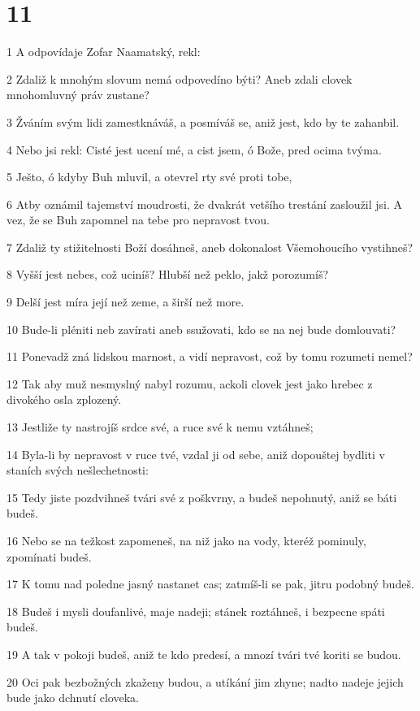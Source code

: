 \chapter{11}

\par 1 A odpovídaje Zofar Naamatský, rekl:
\par 2 Zdaliž k mnohým slovum nemá odpovedíno býti? Aneb zdali clovek mnohomluvný práv zustane?
\par 3 Žváním svým lidi zamestknáváš, a posmíváš se, aniž jest, kdo by te zahanbil.
\par 4 Nebo jsi rekl: Cisté jest ucení mé, a cist jsem, ó Bože, pred ocima tvýma.
\par 5 Ješto, ó kdyby Buh mluvil, a otevrel rty své proti tobe,
\par 6 Atby oznámil tajemství moudrosti, že dvakrát vetšího trestání zasloužil jsi. A vez, že se Buh zapomnel na tebe pro nepravost tvou.
\par 7 Zdaliž ty stižitelnosti Boží dosáhneš, aneb dokonalost Všemohoucího vystihneš?
\par 8 Vyšší jest nebes, což uciníš? Hlubší než peklo, jakž porozumíš?
\par 9 Delší jest míra její než zeme, a širší než more.
\par 10 Bude-li pléniti neb zavírati aneb ssužovati, kdo se na nej bude domlouvati?
\par 11 Ponevadž zná lidskou marnost, a vidí nepravost, což by tomu rozumeti nemel?
\par 12 Tak aby muž nesmyslný nabyl rozumu, ackoli clovek jest jako hrebec z divokého osla zplozený.
\par 13 Jestliže ty nastrojíš srdce své, a ruce své k nemu vztáhneš;
\par 14 Byla-li by nepravost v ruce tvé, vzdal ji od sebe, aniž dopouštej bydliti v staních svých nešlechetnosti:
\par 15 Tedy jiste pozdvihneš tvári své z poškvrny, a budeš nepohnutý, aniž se báti budeš.
\par 16 Nebo se na težkost zapomeneš, na niž jako na vody, kteréž pominuly, zpomínati budeš.
\par 17 K tomu nad poledne jasný nastanet cas; zatmíš-li se pak, jitru podobný budeš.
\par 18 Budeš i mysli doufanlivé, maje nadeji; stánek roztáhneš, i bezpecne spáti budeš.
\par 19 A tak v pokoji budeš, aniž te kdo predesí, a mnozí tvári tvé koriti se budou.
\par 20 Oci pak bezbožných zkaženy budou, a utíkání jim zhyne; nadto nadeje jejich bude jako dchnutí cloveka.


